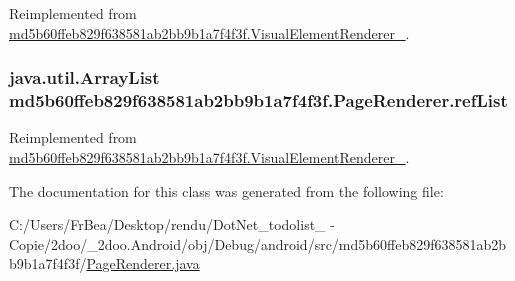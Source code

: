 Reimplemented from \hyperlink{classmd5b60ffeb829f638581ab2bb9b1a7f4f3f_1_1_visual_element_renderer__1_4ef182bc984a4330ed789e1f0b0222d1}{md5b60ffeb829f638581ab2bb9b1a7f4f3f.VisualElementRenderer\_}.\hypertarget{classmd5b60ffeb829f638581ab2bb9b1a7f4f3f_1_1_page_renderer_ac99f9c10a815f0767bf3b6697ebb44a}{
\subsubsection[{refList}]{\setlength{\rightskip}{0pt plus 5cm}java.util.ArrayList {\bf md5b60ffeb829f638581ab2bb9b1a7f4f3f.PageRenderer.refList}}}
\label{classmd5b60ffeb829f638581ab2bb9b1a7f4f3f_1_1_page_renderer_ac99f9c10a815f0767bf3b6697ebb44a}




Reimplemented from \hyperlink{classmd5b60ffeb829f638581ab2bb9b1a7f4f3f_1_1_visual_element_renderer__1_4ebd0e42ebd360712eb189930036fc9f}{md5b60ffeb829f638581ab2bb9b1a7f4f3f.VisualElementRenderer\_}.

The documentation for this class was generated from the following file:\begin{CompactItemize}
\item 
C:/Users/FrBea/Desktop/rendu/DotNet\_\-todolist\_ - Copie/2doo/\_\-2doo.Android/obj/Debug/android/src/md5b60ffeb829f638581ab2bb9b1a7f4f3f/\hyperlink{_page_renderer_8java}{PageRenderer.java}\end{CompactItemize}
